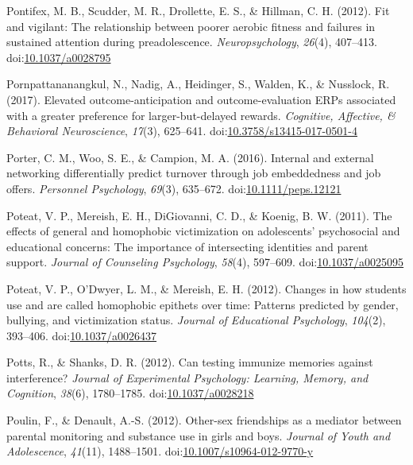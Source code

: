 \documentclass[english,man]{apa6}
\theoremstyle{definition}
\theoremstyle{definition}
\theoremstyle{definition}
\theoremstyle{remark}
\begin{document}
\hypertarget{ref-Pontifex2012}{}
Pontifex, M. B., Scudder, M. R., Drollette, E. S., \& Hillman, C. H.
(2012). Fit and vigilant: The relationship between poorer aerobic
fitness and failures in sustained attention during preadolescence.
\emph{Neuropsychology}, \emph{26}(4), 407--413.
doi:\href{https://doi.org/10.1037/a0028795}{10.1037/a0028795}

\hypertarget{ref-Pornpattananangkul2017}{}
Pornpattananangkul, N., Nadig, A., Heidinger, S., Walden, K., \&
Nusslock, R. (2017). Elevated outcome-anticipation and
outcome-evaluation ERPs associated with a greater preference for
larger-but-delayed rewards. \emph{Cognitive, Affective, \& Behavioral
Neuroscience}, \emph{17}(3), 625--641.
doi:\href{https://doi.org/10.3758/s13415-017-0501-4}{10.3758/s13415-017-0501-4}

\hypertarget{ref-Porter2016}{}
Porter, C. M., Woo, S. E., \& Campion, M. A. (2016). Internal and
external networking differentially predict turnover through job
embeddedness and job offers. \emph{Personnel Psychology}, \emph{69}(3),
635--672.
doi:\href{https://doi.org/10.1111/peps.12121}{10.1111/peps.12121}

\hypertarget{ref-Poteat2011}{}
Poteat, V. P., Mereish, E. H., DiGiovanni, C. D., \& Koenig, B. W.
(2011). The effects of general and homophobic victimization on
adolescents' psychosocial and educational concerns: The importance of
intersecting identities and parent support. \emph{Journal of Counseling
Psychology}, \emph{58}(4), 597--609.
doi:\href{https://doi.org/10.1037/a0025095}{10.1037/a0025095}

\hypertarget{ref-Poteat2012}{}
Poteat, V. P., O'Dwyer, L. M., \& Mereish, E. H. (2012). Changes in how
students use and are called homophobic epithets over time: Patterns
predicted by gender, bullying, and victimization status. \emph{Journal
of Educational Psychology}, \emph{104}(2), 393--406.
doi:\href{https://doi.org/10.1037/a0026437}{10.1037/a0026437}

\hypertarget{ref-Potts2012}{}
Potts, R., \& Shanks, D. R. (2012). Can testing immunize memories
against interference? \emph{Journal of Experimental Psychology:
Learning, Memory, and Cognition}, \emph{38}(6), 1780--1785.
doi:\href{https://doi.org/10.1037/a0028218}{10.1037/a0028218}

\hypertarget{ref-Poulin2012}{}
Poulin, F., \& Denault, A.-S. (2012). Other-sex friendships as a
mediator between parental monitoring and substance use in girls and
boys. \emph{Journal of Youth and Adolescence}, \emph{41}(11),
1488--1501.
doi:\href{https://doi.org/10.1007/s10964-012-9770-y}{10.1007/s10964-012-9770-y}
\end{document}
